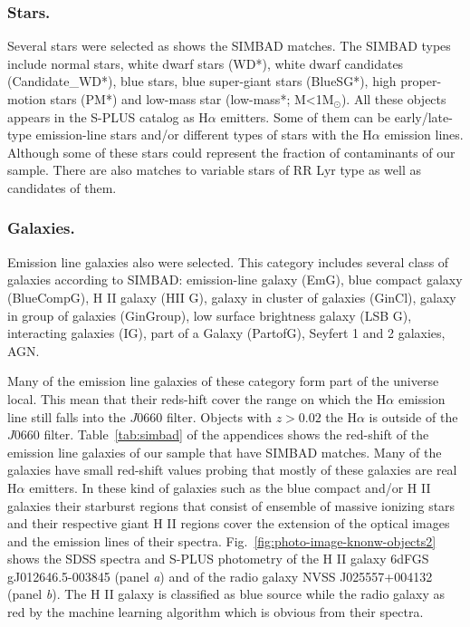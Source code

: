 \documentclass[fleqn,usenatbib]{mnras}
\begin{document}
\subsubsection{Stars.}
Several stars were selected as shows the  SIMBAD matches.
The SIMBAD types include normal stars, white dwarf stars (WD*), white dwarf
candidates (Candidate\_WD*), blue stars, blue super-giant stars (BlueSG*), high
proper-motion stars (PM*) and low-mass star (low-mass*; M<1M$_\odot$). All these
objects appears in the S-PLUS catalog as H{$\alpha$} emitters. Some of them 
can be early/late-type emission-line stars and/or different types of stars with
the H{$\alpha$} emission lines. Although some of these stars could represent the 
fraction of contaminants of our sample. There are also matches to variable
stars of RR Lyr type as well as candidates of them.

\subsubsection{Galaxies.}
Emission line galaxies also were selected. This category includes
several class of galaxies according to SIMBAD: emission-line galaxy (EmG),
blue compact galaxy (BlueCompG), H II galaxy (HII G), galaxy in cluster of galaxies
(GinCl), galaxy in group of galaxies (GinGroup), low surface brightness galaxy
(LSB G), interacting galaxies (IG), part of a Galaxy (PartofG), Seyfert 1 and
2 galaxies, AGN.

Many of the emission line galaxies of these category form part of the universe local.
This mean that their reds-hift cover the range on which the H{$\alpha$} emission line still
falls into the $J0660$ filter. Objects with $ z >  0.02$ the  H{$\alpha$} is outside 
of the $J0660$ filter. Table~\ref{tab:simbad} of the appendices shows the red-shift of the
emission line galaxies of our sample that have SIMBAD matches. Many of the galaxies have 
small red-shift values probing that mostly of these galaxies are real H{$\alpha$} emitters. 
In these kind of galaxies such as the blue 
compact and/or H II galaxies their starburst regions that consist of ensemble of massive 
ionizing stars and their respective giant H II regions cover the extension of the optical 
images and the emission lines of their spectra. Fig.~\ref{fig:photo-image-knonw-objects2}
shows the SDSS spectra and S-PLUS photometry of the H II galaxy 6dFGS gJ012646.5-003845 
(panel \textit{a}) and of the radio galaxy NVSS J025557+004132 (panel \textit{b}). 
The H II galaxy is classified  as blue source while the radio galaxy as red by the 
machine learning algorithm which is obvious from their spectra. 
\end{document}

